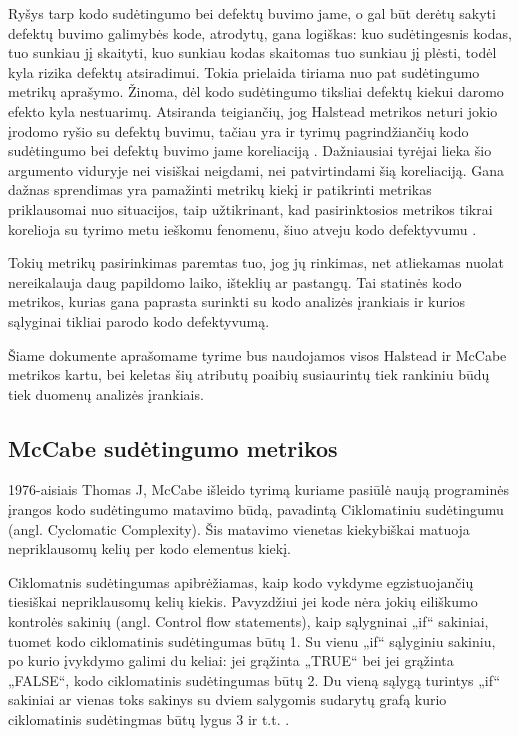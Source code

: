 \documentclass{VUMIFPSbakalaurinis}
\begin{document}
Ryšys tarp kodo sudėtingumo bei defektų buvimo jame, o gal būt derėtų sakyti defektų buvimo galimybės kode, atrodytų, gana logiškas: kuo sudėtingesnis kodas, tuo sunkiau jį skaityti, kuo sunkiau kodas skaitomas tuo sunkiau jį plėsti, todėl kyla rizika defektų atsiradimui. Tokia prielaida tiriama nuo pat sudėtingumo metrikų aprašymo. Žinoma, dėl kodo sudėtingumo tiksliai defektų kiekui daromo efekto kyla nestuarimų. Atsiranda teigiančių, jog Halstead metrikos neturi jokio įrodomo ryšio su defektų buvimu, tačiau yra ir tyrimų pagrindžiančių kodo sudėtingumo bei defektų buvimo jame koreliaciją \cite{Schroeder1999APG}. Dažniausiai tyrėjai lieka šio argumento viduryje nei visiškai neigdami, nei patvirtindami šią koreliaciją. Gana dažnas sprendimas yra pamažinti metrikų kiekį ir patikrinti metrikas priklausomai nuo situacijos, taip užtikrinant, kad pasirinktosios metrikos tikrai korelioja su tyrimo metu ieškomu fenomenu, šiuo atveju kodo defektyvumu \cite{MetricsinEvaluatingSoftwareDefects:2013}.

Tokių metrikų pasirinkimas paremtas tuo, jog jų rinkimas, net atliekamas nuolat nereikalauja daug papildomo laiko, išteklių ar pastangų. Tai statinės kodo metrikos, kurias gana paprasta surinkti su kodo analizės įrankiais ir kurios sąlyginai tikliai parodo kodo defektyvumą.

Šiame dokumente aprašomame tyrime bus naudojamos visos Halstead ir McCabe metrikos kartu, bei keletas šių atributų poaibių susiaurintų tiek rankiniu būdų tiek duomenų analizės įrankiais.

\subsection{McCabe sudėtingumo metrikos}
1976-aisiais Thomas J, McCabe išleido tyrimą kuriame pasiūlė naują programinės įrangos kodo sudėtingumo matavimo būdą, pavadintą Ciklomatiniu sudėtingumu (angl. Cyclomatic Complexity). Šis matavimo vienetas kiekybiškai matuoja nepriklausomų kelių per kodo elementus kiekį.

Ciklomatnis sudėtingumas apibrėžiamas, kaip kodo vykdyme egzistuojančių tiesiškai nepriklausomų kelių kiekis. Pavyzdžiui jei kode nėra jokių eiliškumo kontrolės sakinių (angl. Control flow statements), kaip sąlygninai „if“ sakiniai, tuomet kodo ciklomatinis sudėtingumas būtų 1. Su vienu „if“ sąlyginiu sakiniu, po kurio įvykdymo galimi du keliai: jei grąžinta „TRUE“ bei jei grąžinta „FALSE“, kodo ciklomatinis sudėtingumas būtų 2. Du vieną sąlygą turintys „if“ sakiniai ar vienas toks sakinys su dviem salygomis sudarytų grafą kurio ciklomatinis sudėtingmas būtų lygus 3 ir t.t. \cite{McCabe:1976:CM:800253.807712}.
\end{document}
